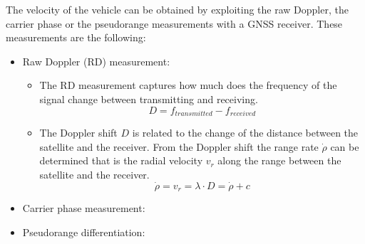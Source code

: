 The velocity of the vehicle can be obtained by exploiting the raw Doppler, the carrier phase or the pseudorange measurements with a GNSS receiver. These measurements are the following: 
\begin{itemize}
    \item Raw Doppler (RD) measurement:
    \begin{itemize}
        \item The RD measurement captures how much does the frequency of the signal change between transmitting and receiving.
        \begin{equation}
            D = f_{transmitted} - f_{received}
        \end{equation}
        \item The Doppler shift $D$ is related to the change of the distance between the satellite and the receiver. From the Doppler shift the range rate $\dot\rho$ can be determined that is the radial velocity $v_r$ along the range between the satellite and the receiver.
        \begin{equation}
            \dot\rho = v_r = \lambda \cdot D = \dot\rho + c
        \end{equation}
    \end{itemize}
    \item Carrier phase measurement:
    \item Pseudorange differentiation:
\end{itemize}


